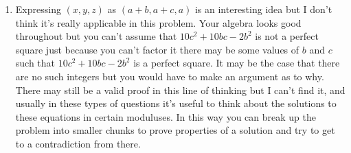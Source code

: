 \documentclass[11pt] {article}
\begin{document}
\begin{enumerate}
\item  Expressing $(x,y,z)$ as $(a+b,a+c,a)$ is an interesting idea but I don't think it's really applicable in this problem. Your algebra looks good throughout but you can't assume that $10c^2 +10bc - 2b^2$ is not a perfect square just because you can't factor it there may be some values of $b$ and $c$ such that $10c^2 +10bc - 2b^2$ is a perfect square. It may be the case that there are no such integers but you would have to make an argument as to why.  There may still be a valid proof in this line of thinking but I can't find it, and usually in these types of questions it's useful to think about the solutions to these equations in certain moduluses. In this way you can break up the problem into smaller chunks to prove properties of a solution and try to get to a contradiction from there.
\end{enumerate}
\end{document}
